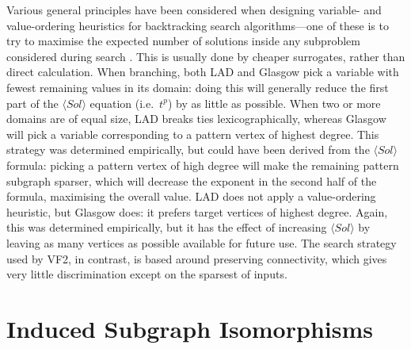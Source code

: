 \documentclass[twoside,11pt]{article}
\newcommand{\citep}[1]{\cite{#1}}
\begin{document}
Various general principles have been considered when designing variable- and value-ordering
heuristics for backtracking search algorithms---one of these is to try to maximise the expected
number of solutions inside any subproblem considered during search \citep{DBLP:conf/cp/GentMPSW96}.
This is usually done by cheaper surrogates, rather than direct calculation. When branching, both LAD
and Glasgow pick a variable with fewest remaining values in its domain: doing this will generally
reduce the first part of the $\langle Sol \rangle$ equation (i.e.\ $t^p$) by as little as possible.
When two or more domains are of equal size, LAD breaks ties lexicographically, whereas Glasgow will
pick a variable corresponding to a pattern vertex of highest degree. This strategy was determined
empirically, but could have been derived from the $\langle Sol \rangle$ formula: picking a pattern
vertex of high degree will make the remaining pattern subgraph sparser, which will decrease the
exponent in the second half of the formula, maximising the overall value. LAD does not apply a
value-ordering heuristic, but Glasgow does: it prefers target vertices of highest degree.  Again,
this was determined empirically, but it has the effect of increasing $\langle Sol \rangle$ by
leaving as many vertices as possible available for future use. The search strategy used by VF2, in
contrast, is based around preserving connectivity, which gives very little discrimination except on
the sparsest of inputs.

\section{Induced Subgraph Isomorphisms}\label{section:induced}
\end{document}
